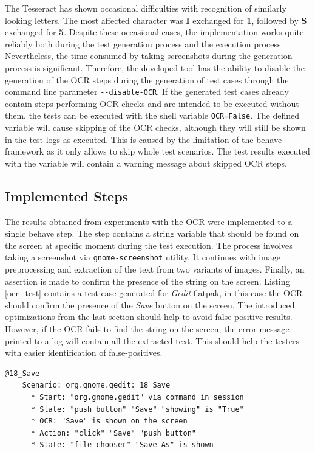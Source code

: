 The Tesseract has shown occasional difficulties with recognition of similarly looking letters. The most affected character was \textbf{I} exchanged for \textbf{1}, followed by \textbf{S} exchanged for \textbf{5}. Despite these occasional cases, the implementation works quite reliably both during the test generation process and the execution process. Nevertheless, the time consumed by taking screenshots during the generation process is significant. Therefore, the developed tool has the ability to disable the generation of the OCR steps during the generation of test cases through the command line parameter \texttt{-{}-disable-OCR}. If the generated test cases already contain steps performing OCR checks and are intended to be executed without them, the tests can be executed with the shell variable \texttt{OCR=False}. The defined variable will cause skipping of the OCR checks, although they will still be shown in the test logs as executed. This is caused by the limitation of the behave framework as it only allows to skip whole test scenarios. The test results executed with the variable will contain a warning message about skipped OCR steps.

\subsection{Implemented Steps}
The results obtained from experiments with the OCR were implemented to a single behave step. The step contains a string variable that should be found on the screen at specific moment during the test execution. The process involves taking a screenshot via \texttt{gnome-screenshot} utility. It continues with image preprocessing and extraction of the text from two variants of images. Finally, an assertion is made to confirm the presence of the string on the screen. Listing \ref{ocr_test} contains a test case generated for \textit{Gedit} flatpak, in this case the OCR should confirm the presence of the \textit{Save} button on the screen. The introduced optimizations from the last section should help to avoid false-positive results. However, if the OCR fails to find the string on the screen, the error message printed to a log will contain all the extracted text. This should help the testers with easier identification of false-positives.

\begin{lstlisting}[language=Gherkin,caption={Test case demonstrating the OCR integration in test cases},label={ocr_test}]
    @18_Save
    Scenario: org.gnome.gedit: 18_Save
      * Start: "org.gnome.gedit" via command in session
      * State: "push button" "Save" "showing" is "True"
      * OCR: "Save" is shown on the screen
      * Action: "click" "Save" "push button"
      * State: "file chooser" "Save As" is shown
\end{lstlisting}


